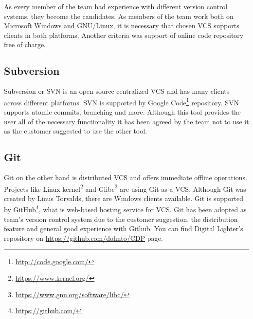 As every member of the team had experience with different version control systems, they become the candidates. As members of the team work both on Microsoft Windows and GNU/Linux, it is necessary that chosen VCS supports clients in both platforms. Another criteria was support of online code repository free of charge.


\subsection{Subversion}
Subversion or SVN is an open source centralized VCS and has many clients across different platforms. 
SVN is supported by Google Code\footnote{\url{http://code.google.com/}} repository.
SVN supports atomic commits, branching and more. Although this tool provides the user all of the necessary functionality it has been agreed by the team not to use it as the customer suggested to use the other tool.


\subsection{Git}
Git on the other hand is distributed VCS and offers immediate offline operations.
Projects like Linux kernel\footnote{\url{https://www.kernel.org/}} and Glibc\footnote{\url{https://www.gnu.org/software/libc/}} are using Git as a VCS.
Although Git was created by Linus Torvalds, there are Windows clients available.
Git is supported by GitHub\footnote{\url{https://github.com/}}, what is web-based hosting service for VCS. Git has been adopted as team's version control system due to the customer suggestion, the distribution feature and general good experience with Github.
You can find Digital Lighter's repository on \url{https://github.com/dohnto/CDP} page.




